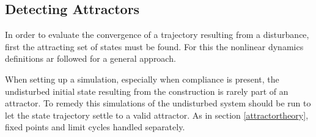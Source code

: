 









\subsection{Detecting Attractors} \label{attractors}

In order to evaluate the convergence of a trajectory resulting from a disturbance, first the attracting set of states must be found. For this the nonlinear dynamics definitions ar followed for a general approach.


When setting up a simulation, especially when compliance is present, the undisturbed initial state resulting from the construction is rarely part of an attractor. To remedy this simulations of the undisturbed system should be run to let the state trajectory settle to a valid attractor. As in section \ref{attractortheory}, fixed points and limit cycles handled separately. 

